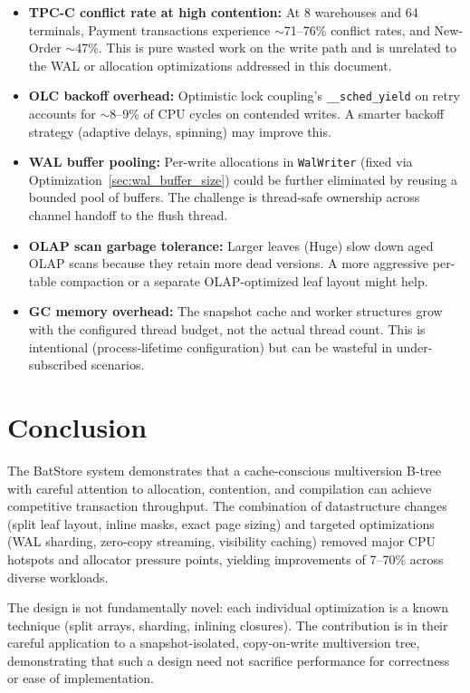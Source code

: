 \documentclass[11pt]{article}
\newcommand{\code}[1]{\texttt{#1}}
\begin{document}
\begin{itemize}
  \item \textbf{TPC-C conflict rate at high contention:} At 8 warehouses and 64 terminals,
        Payment transactions experience $\sim$71--76\% conflict rates, and New-Order $\sim$47\%.
        This is pure wasted work on the write path and is unrelated to the WAL or allocation
        optimizations addressed in this document.

  \item \textbf{OLC backoff overhead:} Optimistic lock coupling's \code{\_\_sched\_yield}
        on retry accounts for $\sim$8--9\% of CPU cycles on contended writes. A smarter
        backoff strategy (adaptive delays, spinning) may improve this.

  \item \textbf{WAL buffer pooling:} Per-write allocations in \code{WalWriter} (fixed via
        Optimization~\ref{sec:wal_buffer_size}) could be further eliminated by reusing a
        bounded pool of buffers. The challenge is thread-safe ownership across channel
        handoff to the flush thread.

  \item \textbf{OLAP scan garbage tolerance:} Larger leaves (Huge) slow down aged OLAP scans
        because they retain more dead versions. A more aggressive per-table compaction or
        a separate OLAP-optimized leaf layout might help.

  \item \textbf{GC memory overhead:} The snapshot cache and worker structures grow with the
        configured thread budget, not the actual thread count. This is intentional (process-lifetime
        configuration) but can be wasteful in under-subscribed scenarios.
\end{itemize}

\newpage

\section{Conclusion}

The BatStore system demonstrates that a cache-conscious multiversion B-tree with
careful attention to allocation, contention, and compilation can achieve competitive
transaction throughput. The combination of datastructure changes (split leaf layout,
inline masks, exact page sizing) and targeted optimizations (WAL sharding, zero-copy
streaming, visibility caching) removed major CPU hotspots and allocator pressure points,
yielding improvements of 7--70\% across diverse workloads.

The design is not fundamentally novel: each individual optimization is a known technique
(split arrays, sharding, inlining closures). The contribution is in their careful
application to a snapshot-isolated, copy-on-write multiversion tree, demonstrating that
such a design need not sacrifice performance for correctness or ease of implementation.
\end{document}
